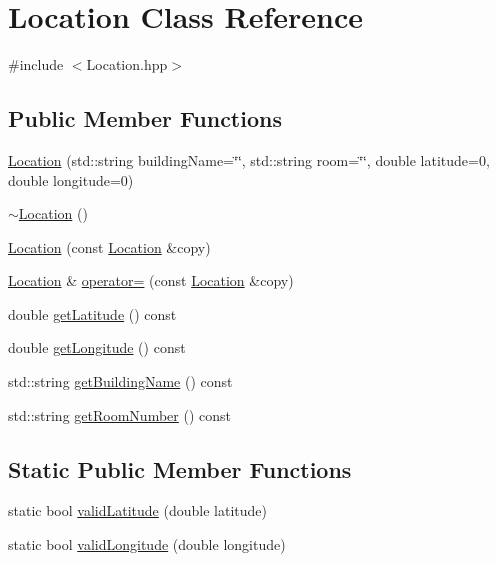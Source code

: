 \hypertarget{class_location}{}\section{Location Class Reference}
\label{class_location}


{\ttfamily \#include $<$Location.\+hpp$>$}

\subsection*{Public Member Functions}
\begin{DoxyCompactItemize}
\item 
\hyperlink{class_location_a03024e9a073b840570deee4ca330a9c2}{Location} (std\+::string building\+Name=\char`\"{}\char`\"{}, std\+::string room=\char`\"{}\char`\"{}, double latitude=0, double longitude=0)
\item 
\hyperlink{class_location_af5be2c6550bbd96137cbb3144ec3c529}{$\sim$\+Location} ()
\item 
\hyperlink{class_location_ade30a08f4ad26d0533a2bfccb4a936c4}{Location} (const \hyperlink{class_location}{Location} \&copy)
\item 
\hyperlink{class_location}{Location} \& \hyperlink{class_location_acc621711c145afbd74bbca71ea899991}{operator=} (const \hyperlink{class_location}{Location} \&copy)
\item 
double \hyperlink{class_location_a598d5b9de6818a56d68e56a91c035ccc}{get\+Latitude} () const 
\item 
double \hyperlink{class_location_a8e47c48aed96a3a938c1af595e056f2e}{get\+Longitude} () const 
\item 
std\+::string \hyperlink{class_location_a399201168914f1a4a413aedd96e8c55e}{get\+Building\+Name} () const 
\item 
std\+::string \hyperlink{class_location_aa77270025ed78f9c454c82fe3c62fd4f}{get\+Room\+Number} () const 
\end{DoxyCompactItemize}
\subsection*{Static Public Member Functions}
\begin{DoxyCompactItemize}
\item 
static bool \hyperlink{class_location_a2a018c8b6060185bdd1231549fbd30e8}{valid\+Latitude} (double latitude)
\item 
static bool \hyperlink{class_location_afdb8bbc7913c1413dab7d7b2d5e34a71}{valid\+Longitude} (double longitude)
\end{DoxyCompactItemize}
